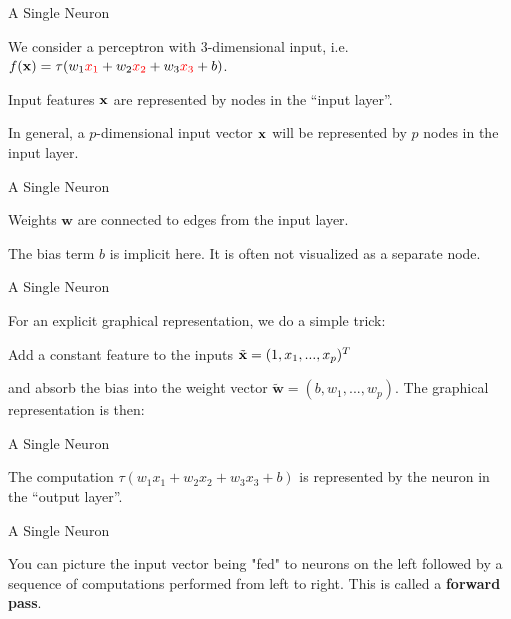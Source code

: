 \documentclass[11pt,compress,t,notes=noshow, xcolor=table]{beamer}
\begin{document}
\begin{framei} {A Single Neuron}
\item We consider a perceptron with $3$-dimensional input, i.e. $f(\mathbf{x}) = \tau(w_1\textcolor{red}{x_1} + w_2\textcolor{red}{x_2} + w_3\textcolor{red}{x_3} + b)$.
\item %
Input features $\mathbf{x}$ are represented by nodes in the \enquote{input layer}.
\item In general, a $p$-dimensional input vector $\mathbf{x}$ will be represented by $p$ nodes in the input layer.
\end{framei}

\begin{framei} {A Single Neuron}
\item Weights $\mathbf{w}$ are connected to edges from the input layer.
\item The bias term $b$ is implicit here. It is often not visualized as a separate node.
\end{framei}

\begin{framei} {A Single Neuron}
\item For an explicit graphical representation, we do a simple trick: 
\item Add a constant feature to the inputs $\tilde{\mathbf{x}} = (1, x_1, ..., x_p)^T$
\item and absorb the bias into the weight vector $\tilde{\bm{w}} = (b, w_1, ..., w_p)$.
The graphical representation is then: 
\end{framei}

\begin{framei} {A Single Neuron}
\item The computation $\tau(w_1x_1 + w_2x_2 + w_3x_3 + b)$ is represented by the neuron in the \enquote{output layer}.
\end{framei}

\begin{framei} {A Single Neuron}
\item %
You can picture the input vector being "fed" to neurons on the left followed by a sequence of computations performed from left to right. This is called a \textbf{forward pass}.
\end{framei}
\end{document}
